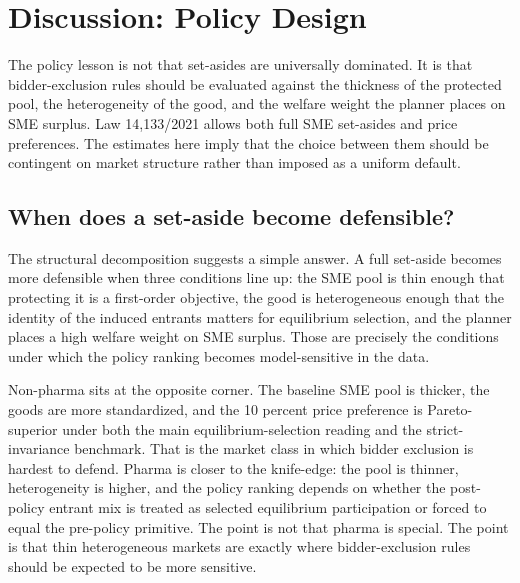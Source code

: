\section{Discussion: Policy Design}\label{sec:discussion}

The policy lesson is not that set-asides are universally dominated. It is that bidder-exclusion rules should be evaluated against the thickness of the protected pool, the heterogeneity of the good, and the welfare weight the planner places on SME surplus. Law 14{,}133/2021 allows both full SME set-asides and price preferences. The estimates here imply that the choice between them should be contingent on market structure rather than imposed as a uniform default.

\subsection{When does a set-aside become defensible?}

The structural decomposition suggests a simple answer. A full set-aside becomes more defensible when three conditions line up: the SME pool is thin enough that protecting it is a first-order objective, the good is heterogeneous enough that the identity of the induced entrants matters for equilibrium selection, and the planner places a high welfare weight on SME surplus. Those are precisely the conditions under which the policy ranking becomes model-sensitive in the data.

Non-pharma sits at the opposite corner. The baseline SME pool is thicker, the goods are more standardized, and the 10 percent price preference is Pareto-superior under both the main equilibrium-selection reading and the strict-invariance benchmark. That is the market class in which bidder exclusion is hardest to defend. Pharma is closer to the knife-edge: the pool is thinner, heterogeneity is higher, and the policy ranking depends on whether the post-policy entrant mix is treated as selected equilibrium participation or forced to equal the pre-policy primitive. The point is not that pharma is special. The point is that thin heterogeneous markets are exactly where bidder-exclusion rules should be expected to be more sensitive.

